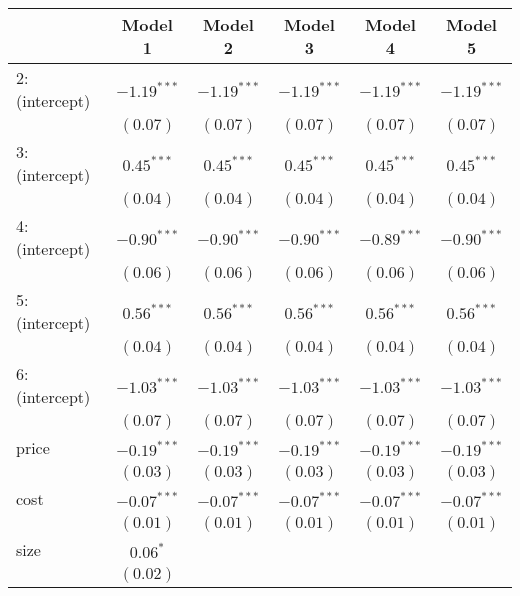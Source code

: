 
\begin{table}
\tiny
\begin{center}
\begin{tabular}{l c c c c c }
\hline
 & Model 1 & Model 2 & Model 3 & Model 4 & Model 5 \\
\hline
2:(intercept)          & $-1.19^{***}$ & $-1.19^{***}$ & $-1.19^{***}$ & $-1.19^{***}$ & $-1.19^{***}$ \\
                       & $(0.07)$      & $(0.07)$      & $(0.07)$      & $(0.07)$      & $(0.07)$      \\
3:(intercept)          & $0.45^{***}$  & $0.45^{***}$  & $0.45^{***}$  & $0.45^{***}$  & $0.45^{***}$  \\
                       & $(0.04)$      & $(0.04)$      & $(0.04)$      & $(0.04)$      & $(0.04)$      \\
4:(intercept)          & $-0.90^{***}$ & $-0.90^{***}$ & $-0.90^{***}$ & $-0.89^{***}$ & $-0.90^{***}$ \\
                       & $(0.06)$      & $(0.06)$      & $(0.06)$      & $(0.06)$      & $(0.06)$      \\
5:(intercept)          & $0.56^{***}$  & $0.56^{***}$  & $0.56^{***}$  & $0.56^{***}$  & $0.56^{***}$  \\
                       & $(0.04)$      & $(0.04)$      & $(0.04)$      & $(0.04)$      & $(0.04)$      \\
6:(intercept)          & $-1.03^{***}$ & $-1.03^{***}$ & $-1.03^{***}$ & $-1.03^{***}$ & $-1.03^{***}$ \\
                       & $(0.07)$      & $(0.07)$      & $(0.07)$      & $(0.07)$      & $(0.07)$      \\
price                  & $-0.19^{***}$ & $-0.19^{***}$ & $-0.19^{***}$ & $-0.19^{***}$ & $-0.19^{***}$ \\
                       & $(0.03)$      & $(0.03)$      & $(0.03)$      & $(0.03)$      & $(0.03)$      \\
cost                   & $-0.07^{***}$ & $-0.07^{***}$ & $-0.07^{***}$ & $-0.07^{***}$ & $-0.07^{***}$ \\
                       & $(0.01)$      & $(0.01)$      & $(0.01)$      & $(0.01)$      & $(0.01)$      \\
size                   & $0.06^{*}$    &               &               &               &               \\
                       & $(0.02)$      &               &               &               &               \\

\end{tabular}
\end{center}
\end{table}

